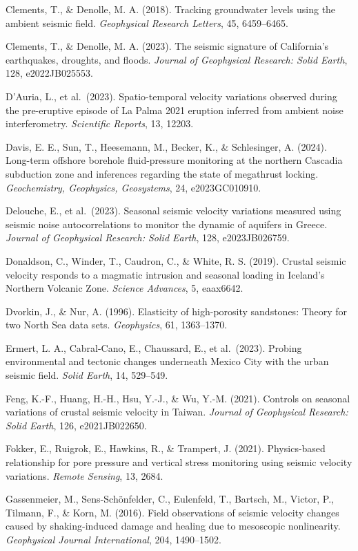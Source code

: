 \documentclass[draft]{agujournal2019}
\begin{document}
Clements, T., \& Denolle, M. A. (2018). Tracking groundwater levels
using the ambient seismic field. \emph{Geophysical Research Letters},
45, 6459--6465.

Clements, T., \& Denolle, M. A. (2023). The seismic signature of
California's earthquakes, droughts, and floods. \emph{Journal of
Geophysical Research: Solid Earth}, 128, e2022JB025553.

D'Auria, L., et al.~(2023). Spatio-temporal velocity variations observed
during the pre-eruptive episode of La Palma 2021 eruption inferred from
ambient noise interferometry. \emph{Scientific Reports}, 13, 12203.

Davis, E. E., Sun, T., Heesemann, M., Becker, K., \& Schlesinger, A.
(2024). Long-term offshore borehole fluid-pressure monitoring at the
northern Cascadia subduction zone and inferences regarding the state of
megathrust locking. \emph{Geochemistry, Geophysics, Geosystems}, 24,
e2023GC010910.

Delouche, E., et al.~(2023). Seasonal seismic velocity variations
measured using seismic noise autocorrelations to monitor the dynamic of
aquifers in Greece. \emph{Journal of Geophysical Research: Solid Earth},
128, e2023JB026759.

Donaldson, C., Winder, T., Caudron, C., \& White, R. S. (2019). Crustal
seismic velocity responds to a magmatic intrusion and seasonal loading
in Iceland's Northern Volcanic Zone. \emph{Science Advances}, 5,
eaax6642.

Dvorkin, J., \& Nur, A. (1996). Elasticity of high-porosity sandstones:
Theory for two North Sea data sets. \emph{Geophysics}, 61, 1363--1370.

Ermert, L. A., Cabral-Cano, E., Chaussard, E., et al.~(2023). Probing
environmental and tectonic changes underneath Mexico City with the urban
seismic field. \emph{Solid Earth}, 14, 529--549.

Feng, K.-F., Huang, H.-H., Hsu, Y.-J., \& Wu, Y.-M. (2021). Controls on
seasonal variations of crustal seismic velocity in Taiwan. \emph{Journal
of Geophysical Research: Solid Earth}, 126, e2021JB022650.

Fokker, E., Ruigrok, E., Hawkins, R., \& Trampert, J. (2021).
Physics-based relationship for pore pressure and vertical stress
monitoring using seismic velocity variations. \emph{Remote Sensing}, 13,
2684.

Gassenmeier, M., Sens-Schönfelder, C., Eulenfeld, T., Bartsch, M.,
Victor, P., Tilmann, F., \& Korn, M. (2016). Field observations of
seismic velocity changes caused by shaking-induced damage and healing
due to mesoscopic nonlinearity. \emph{Geophysical Journal
International}, 204, 1490--1502.
\end{document}
